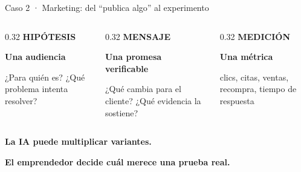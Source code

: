 \documentclass[aspectratio=169,11pt]{beamer}
\newcommand{\kicker}[1]{{\color{gold}\scriptsize\bfseries\MakeUppercase{#1}}}
\newcommand{\muted}[1]{{\color{muted}#1}}
\begin{document}
\begin{frame}{Caso 2 · Marketing: del “publica algo” al experimento}
\begin{columns}[T,onlytextwidth]
\begin{column}{0.32\textwidth}
\kicker{Hipótesis}\par\vspace{0.15cm}
\textbf{Una audiencia}\par
\small\muted{¿Para quién es? ¿Qué problema intenta resolver?}
\end{column}
\begin{column}{0.32\textwidth}
\kicker{Mensaje}\par\vspace{0.15cm}
\textbf{Una promesa verificable}\par
\small\muted{¿Qué cambia para el cliente? ¿Qué evidencia la sostiene?}
\end{column}
\begin{column}{0.32\textwidth}
\kicker{Medición}\par\vspace{0.15cm}
\textbf{Una métrica}\par
\small\muted{clics, citas, ventas, recompra, tiempo de respuesta}
\end{column}
\end{columns}

\vspace{0.65cm}
{\Large\bfseries La IA puede multiplicar variantes.}\par
\vspace{0.10cm}
{\Large\color{forest}\bfseries El emprendedor decide cuál merece una prueba real.}
\end{frame}
\end{document}
